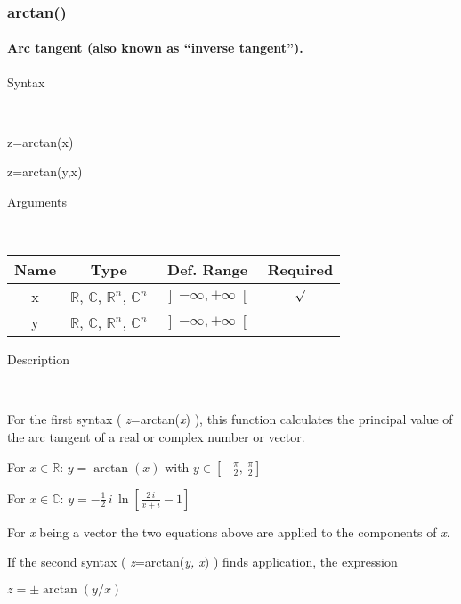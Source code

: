 \newpage
\subsubsection*{\hypertarget{arctan}{}{\Large arctan()}}


\paragraph{\label{par:Arc-tangent}Arc tangent (also known as {}``inverse tangent'').}

\begin{description}
\item [Syntax]~
\end{description}
z=arctan(x)

\noindent z=arctan(y,x)

\begin{description}
\item [Arguments]~
\end{description}
\begin{tabular}{|c|c|c|c|}
\hline 
Name&
Type&
Def. Range&
Required\tabularnewline
\hline
\hline 
x&
$\mathbb{R}$, $\mathbb{C}$, $\mathbb{R}^{n}$, $\mathbb{C}^{n}$&
$\left]-\infty,+\infty\right[$&
$\surd$\tabularnewline
\hline
y&
$\mathbb{R}$, $\mathbb{C}$, $\mathbb{R}^{n}$, $\mathbb{C}^{n}$&
$\left]-\infty,+\infty\right[$&
\tabularnewline
\hline
\end{tabular}

\begin{description}
\item [Description]~
\end{description}
For the first syntax ( \textit{z}=arctan(\textit{x}) ), this function
calculates the principal value of the arc tangent of a real or complex
number or vector.

\medskip{}
For $x\in\mathbb{R}$: $y=\arctan\left(x\right)$ with $y\in\left[-\frac{\pi}{2},\,\frac{\pi}{2}\right]$

\medskip{}
For $x\in\mathbb{C}$: $y={\displaystyle -\frac{1}{2}\, i\,\ln\left[\frac{2\, i}{x+i}-1\right]}$
\medskip{}

\noindent For \textit{x} being a vector the two equations above are
applied to the components of \textit{x}.

\noindent If the second syntax ( \textit{z}=arctan(\textit{y, x})
) finds application, the expression

\medskip{}
$z=\pm\arctan\left(y/x\right)$
\medskip{}

